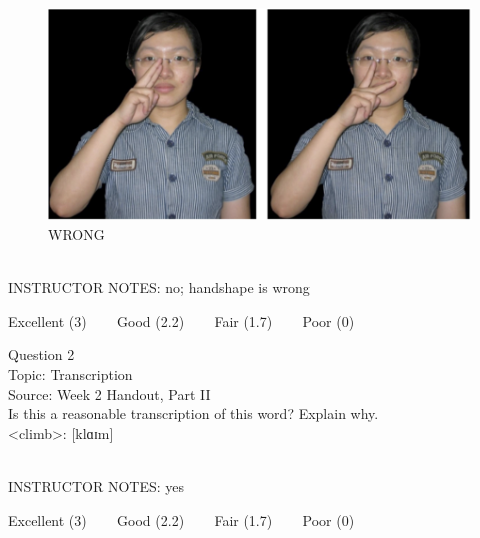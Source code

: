 \documentclass[12pt]{article}
\begin{document}
\begin{figure}[H]
\includegraphics{../images/taiwansign_wrong.png}
\caption{WRONG}
\end{figure}

~\\
INSTRUCTOR NOTES: no; handshape is wrong


\vfill
Excellent (3) ~~~ Good (2.2) ~~~ Fair (1.7) ~~~ Poor (0)
\newpage

{\large Question 2}\\

Topic: Transcription\\
Source: Week 2 Handout, Part II\\

Is this a reasonable transcription of this word? Explain why.\\

<climb>: {[klɑɪm]}


~\\
INSTRUCTOR NOTES: yes


\vfill
Excellent (3) ~~~ Good (2.2) ~~~ Fair (1.7) ~~~ Poor (0)
\newpage

\begin{center}
\textbf{{\color{red}{\HUGE END OF EXAM}}}\\

\end{center}
\newpage

\begin{center}
\textbf{{\color{blue}{\HUGE START OF EXAM\\}}}

\textbf{{\color{blue}{\HUGE Student ID: 52900\\}}}

\textbf{{\color{blue}{\HUGE 4:20\\}}}

\end{center}
\newpage
\end{document}
